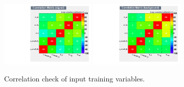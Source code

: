 \begin{figure}[h]
\begin{center}
\includegraphics[width = 0.4\textwidth,angle=-90]{fig/SigOpt/correlation_signal.pdf}
\includegraphics[width = 0.4\textwidth,angle=-90]{fig/SigOpt/correlation_bkg.pdf}
\caption{Correlation check of input training variables.} \label{fig:correlation_check}
\end{center}
\end{figure}

